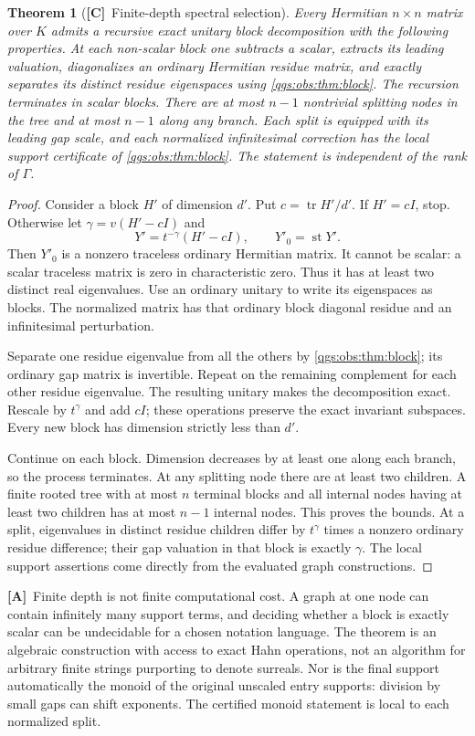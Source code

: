 \documentclass[11pt,oneside]{article}
\numberwithin{equation}{section}
\theoremstyle{plain}
\newtheorem{theorem}{Theorem}[section]
\theoremstyle{definition}
\theoremstyle{remark}
\DeclareMathOperator{\st}{st}
\DeclareMathOperator{\tr}{tr}
\newcommand{\TC}{\textcolor{TierC}{\textsf{\bfseries[C]}}}
\newcommand{\TA}{\textcolor{TierA}{\textsf{\bfseries[A]}}}
\begin{document}
\begin{theorem}[\TC\ Finite-depth spectral selection]\label{qgs:obs:thm:hierarchy}
Every Hermitian $n\times n$ matrix over $K$ admits a recursive exact unitary block decomposition with the following properties. At each non-scalar block one subtracts a scalar, extracts its leading valuation, diagonalizes an ordinary Hermitian residue matrix, and exactly separates its distinct residue eigenspaces using \cref{qgs:obs:thm:block}. The recursion terminates in scalar blocks. There are at most $n-1$ nontrivial splitting nodes in the tree and at most $n-1$ along any branch. Each split is equipped with its leading gap scale, and each normalized infinitesimal correction has the local support certificate of \cref{qgs:obs:thm:block}. The statement is independent of the rank of $\Gamma$.
\end{theorem}
\begin{proof}
Consider a block $H'$ of dimension $d'$. Put $c=\tr H'/d'$. If $H'=cI$, stop. Otherwise let $\gamma=v(H'-cI)$ and
\[
 Y'=t^{-\gamma}(H'-cI),\qquad Y'_0=\st Y'.
\]
Then $Y'_0$ is a nonzero traceless ordinary Hermitian matrix. It cannot be scalar: a scalar traceless matrix is zero in characteristic zero. Thus it has at least two distinct real eigenvalues. Use an ordinary unitary to write its eigenspaces as blocks. The normalized matrix has that ordinary block diagonal residue and an infinitesimal perturbation.

Separate one residue eigenvalue from all the others by \cref{qgs:obs:thm:block}; its ordinary gap matrix is invertible. Repeat on the remaining complement for each other residue eigenvalue. The resulting unitary makes the decomposition exact. Rescale by $t^\gamma$ and add $cI$; these operations preserve the exact invariant subspaces. Every new block has dimension strictly less than $d'$.

Continue on each block. Dimension decreases by at least one along each branch, so the process terminates. At any splitting node there are at least two children. A finite rooted tree with at most $n$ terminal blocks and all internal nodes having at least two children has at most $n-1$ internal nodes. This proves the bounds. At a split, eigenvalues in distinct residue children differ by $t^\gamma$ times a nonzero ordinary residue difference; their gap valuation in that block is exactly $\gamma$. The local support assertions come directly from the evaluated graph constructions.
\end{proof}

\TA\ Finite depth is not finite computational cost. A graph at one node can contain infinitely many support terms, and deciding whether a block is exactly scalar can be undecidable for a chosen notation language. The theorem is an algebraic construction with access to exact Hahn operations, not an algorithm for arbitrary finite strings purporting to denote surreals. Nor is the final support automatically the monoid of the original unscaled entry supports: division by small gaps can shift exponents. The certified monoid statement is local to each normalized split.
\end{document}
